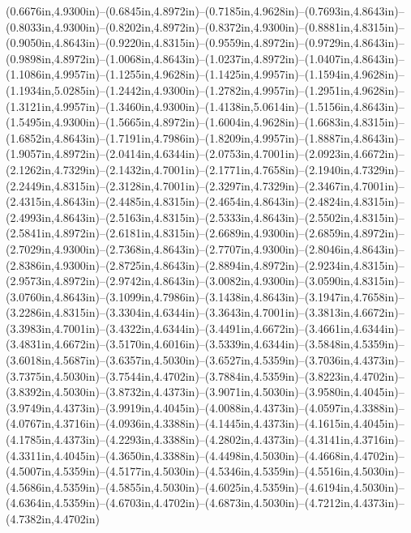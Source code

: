 (0.6676in,4.9300in)--(0.6845in,4.8972in)--(0.7185in,4.9628in)--(0.7693in,4.8643in)--(0.8033in,4.9300in)--(0.8202in,4.8972in)--(0.8372in,4.9300in)--(0.8881in,4.8315in)--(0.9050in,4.8643in)--(0.9220in,4.8315in)--(0.9559in,4.8972in)--(0.9729in,4.8643in)--(0.9898in,4.8972in)--(1.0068in,4.8643in)--(1.0237in,4.8972in)--(1.0407in,4.8643in)--(1.1086in,4.9957in)--(1.1255in,4.9628in)--(1.1425in,4.9957in)--(1.1594in,4.9628in)--(1.1934in,5.0285in)--(1.2442in,4.9300in)--(1.2782in,4.9957in)--(1.2951in,4.9628in)--(1.3121in,4.9957in)--(1.3460in,4.9300in)--(1.4138in,5.0614in)--(1.5156in,4.8643in)--(1.5495in,4.9300in)--(1.5665in,4.8972in)--(1.6004in,4.9628in)--(1.6683in,4.8315in)--(1.6852in,4.8643in)--(1.7191in,4.7986in)--(1.8209in,4.9957in)--(1.8887in,4.8643in)--(1.9057in,4.8972in)--(2.0414in,4.6344in)--(2.0753in,4.7001in)--(2.0923in,4.6672in)--(2.1262in,4.7329in)--(2.1432in,4.7001in)--(2.1771in,4.7658in)--(2.1940in,4.7329in)--(2.2449in,4.8315in)--(2.3128in,4.7001in)--(2.3297in,4.7329in)--(2.3467in,4.7001in)--(2.4315in,4.8643in)--(2.4485in,4.8315in)--(2.4654in,4.8643in)--(2.4824in,4.8315in)--(2.4993in,4.8643in)--(2.5163in,4.8315in)--(2.5333in,4.8643in)--(2.5502in,4.8315in)--(2.5841in,4.8972in)--(2.6181in,4.8315in)--(2.6689in,4.9300in)--(2.6859in,4.8972in)--(2.7029in,4.9300in)--(2.7368in,4.8643in)--(2.7707in,4.9300in)--(2.8046in,4.8643in)--(2.8386in,4.9300in)--(2.8725in,4.8643in)--(2.8894in,4.8972in)--(2.9234in,4.8315in)--(2.9573in,4.8972in)--(2.9742in,4.8643in)--(3.0082in,4.9300in)--(3.0590in,4.8315in)--(3.0760in,4.8643in)--(3.1099in,4.7986in)--(3.1438in,4.8643in)--(3.1947in,4.7658in)--(3.2286in,4.8315in)--(3.3304in,4.6344in)--(3.3643in,4.7001in)--(3.3813in,4.6672in)--(3.3983in,4.7001in)--(3.4322in,4.6344in)--(3.4491in,4.6672in)--(3.4661in,4.6344in)--(3.4831in,4.6672in)--(3.5170in,4.6016in)--(3.5339in,4.6344in)--(3.5848in,4.5359in)--(3.6018in,4.5687in)--(3.6357in,4.5030in)--(3.6527in,4.5359in)--(3.7036in,4.4373in)--(3.7375in,4.5030in)--(3.7544in,4.4702in)--(3.7884in,4.5359in)--(3.8223in,4.4702in)--(3.8392in,4.5030in)--(3.8732in,4.4373in)--(3.9071in,4.5030in)--(3.9580in,4.4045in)--(3.9749in,4.4373in)--(3.9919in,4.4045in)--(4.0088in,4.4373in)--(4.0597in,4.3388in)--(4.0767in,4.3716in)--(4.0936in,4.3388in)--(4.1445in,4.4373in)--(4.1615in,4.4045in)--(4.1785in,4.4373in)--(4.2293in,4.3388in)--(4.2802in,4.4373in)--(4.3141in,4.3716in)--(4.3311in,4.4045in)--(4.3650in,4.3388in)--(4.4498in,4.5030in)--(4.4668in,4.4702in)--(4.5007in,4.5359in)--(4.5177in,4.5030in)--(4.5346in,4.5359in)--(4.5516in,4.5030in)--(4.5686in,4.5359in)--(4.5855in,4.5030in)--(4.6025in,4.5359in)--(4.6194in,4.5030in)--(4.6364in,4.5359in)--(4.6703in,4.4702in)--(4.6873in,4.5030in)--(4.7212in,4.4373in)--(4.7382in,4.4702in) 